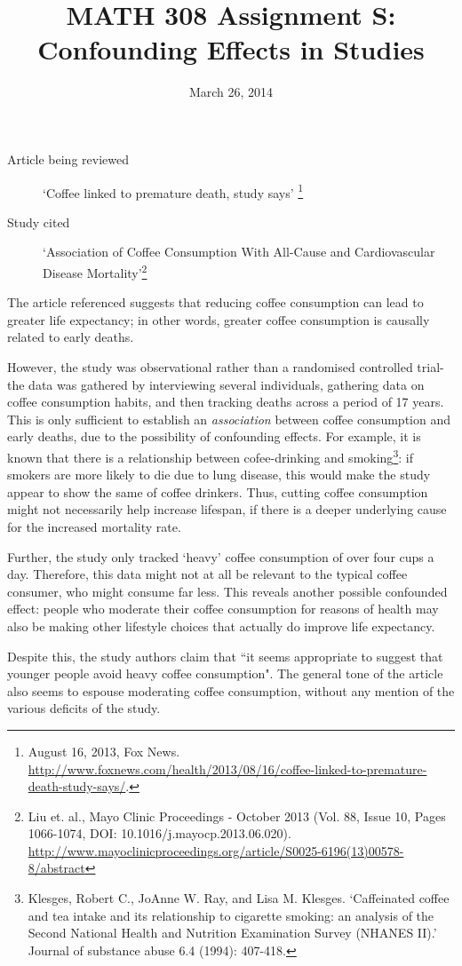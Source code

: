 \documentclass[twocolumn]{article}
\title{MATH 308 Assignment S:\\Confounding Effects in Studies}
\date{March 26, 2014}
\begin{document}
\maketitle
\begin{description}
\item[Article being reviewed] `Coffee linked to premature death, study says'
\footnote{August 16, 2013, Fox News. \url{http://www.foxnews.com/health/2013/08/16/coffee-linked-to-premature-death-study-says/}.} 
\item[Study cited] `Association of Coffee Consumption With All-Cause and Cardiovascular Disease Mortality'\footnote{
	Liu et. al., Mayo Clinic Proceedings - October 2013 (Vol. 88, Issue 10, Pages 1066-1074, DOI: 10.1016/j.mayocp.2013.06.020). \url{http://www.mayoclinicproceedings.org/article/S0025-6196(13)00578-8/abstract}
	}
\end{description}

The article referenced suggests that reducing coffee consumption can lead to greater life expectancy; in other words, greater coffee consumption is causally related to early deaths.

However, the study was observational rather than a randomised controlled trial- the data was gathered by interviewing several individuals, gathering data on coffee consumption habits, and then tracking deaths across a period of 17 years. This is only sufficient to establish an \emph{association} between coffee consumption and early deaths, due to the possibility of confounding effects. For example, it is known that there is a relationship between cofee-drinking and smoking\footnote{Klesges, Robert C., JoAnne W. Ray, and Lisa M. Klesges. `Caffeinated coffee and tea intake and its relationship to cigarette smoking: an analysis of the Second National Health and Nutrition Examination Survey (NHANES II).' Journal of substance abuse 6.4 (1994): 407-418.}: if smokers are more likely to die due to lung disease, this would make the study appear to show the same of coffee drinkers. Thus, cutting coffee consumption might not necessarily help increase lifespan, if there is a deeper underlying cause for the increased mortality rate.

Further, the study only tracked `heavy' coffee consumption of over four cups a day. Therefore, this data might not at all be relevant to the typical coffee consumer, who might consume far less. This reveals another possible confounded effect: people who moderate their coffee consumption for reasons of health may also be making other lifestyle choices that actually do improve life expectancy.

Despite this, the study authors claim that ``it seems appropriate to suggest that younger people avoid heavy coffee consumption". The general tone of the article also seems to espouse moderating coffee consumption, without any mention of the various deficits of the study.
\end{document}
